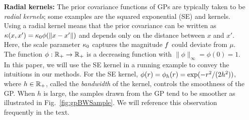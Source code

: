 
\textbf{Radial kernels:}
The prior covariance functions of GPs are typically taken to be \emph{radial kernels};
some examples are the squared exponential (SE)
and \matern{} kernels. 
Using a radial kernel means that the prior covariance can be written as
$\kappa(x,x') = \kappa_0\phi(\|x-x'\|)$ and
depends only on the distance between $x$ and $x'$.
Here, the scale parameter $\kappa_0$ 
captures the magnitude $f$ could deviate from $\mu$.
The function $\phi:\mathbb{R}_{+}\rightarrow\mathbb{R}_+$ is a decreasing function with
$\|\phi\|_\infty = \phi(0) = 1$.
In this paper, we will use the SE kernel in a running example to convey the
intuitions in our methods. 
For the SE kernel, $\phi(r) = \phi_{h}(r) = \exp(-r^2/(2h^2))$, where $h\in\mathbb{R}_+$,  called the \emph{bandwidth} of the kernel, controls the smoothness of the GP.
When $h$ is large, the samples drawn from the GP tend to
be smoother as illustrated in Fig.~\ref{fig:gpBWSample}.
We will reference this observation frequently in the text.

\insertFigBWSample

